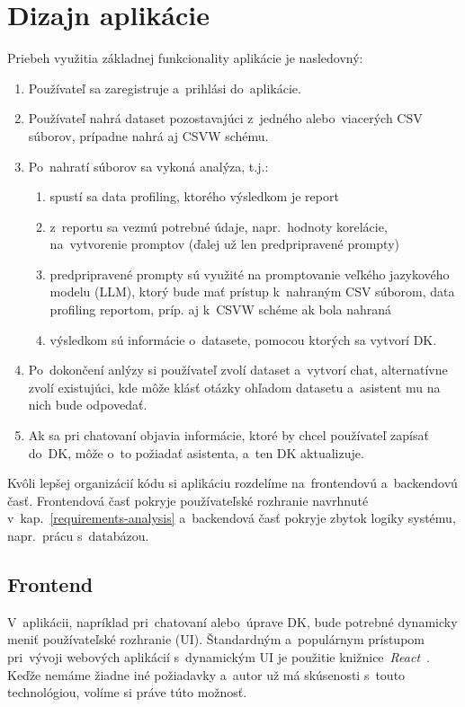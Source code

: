 \chapter{Dizajn aplikácie}

Priebeh využitia základnej funkcionality aplikácie je nasledovný:
\begin{enumerate}
\item Používateľ sa zaregistruje a~prihlási do~aplikácie.
\item Používateľ nahrá dataset pozostavajúci z~jedného alebo~viacerých CSV súborov, prípadne nahrá aj CSVW schému.
\item Po~nahratí súborov sa vykoná analýza, t.j.:
\begin{enumerate}
\item spustí sa data profiling, ktorého výsledkom je report
\item z~reportu sa vezmú potrebné údaje, napr.~hodnoty korelácie, na~vytvorenie promptov (ďalej už len predpripravené prompty)
\item predpripravené prompty sú využité na promptovanie veľkého jazykového modelu (LLM), ktorý bude mať prístup k~nahraným CSV súborom, data profiling reportom, príp. aj k~CSVW schéme ak bola nahraná
\item výsledkom sú informácie o~datasete, pomocou ktorých sa vytvorí DK.
\end{enumerate}
\item Po~dokončení anlýzy si používateľ zvolí dataset a~vytvorí chat, alternatívne zvolí existujúci, kde môže klásť otázky ohľadom datasetu a~asistent mu na nich bude odpovedať.
\item Ak sa pri chatovaní objavia informácie, ktoré by chcel používateľ zapísať do~DK, môže o~to požiadať asistenta, a~ten DK aktualizuje.
\end{enumerate}

Kvôli lepšej organizácií kódu si aplikáciu rozdelíme na~frontendovú a~backendovú časť. Frontendová časť pokryje používateľské rozhranie navrhnuté v~kap.~\ref{requirements-analysis} a~backendová časť pokryje zbytok logiky systému, napr.~prácu s~databázou.

\section{Frontend}

V~aplikácii, napríklad pri~chatovaní alebo~úprave DK, bude potrebné dynamicky meniť používateľské rozhranie (UI). Štandardným a~populárnym prístupom pri~vývoji webových aplikácií s~dynamickým UI je použitie knižnice~\textit{React}~\cite{popular-frontend-frameworks}. Keďže nemáme žiadne iné požiadavky a~autor už má skúsenosti s~touto technológiou, volíme si práve túto možnosť.

